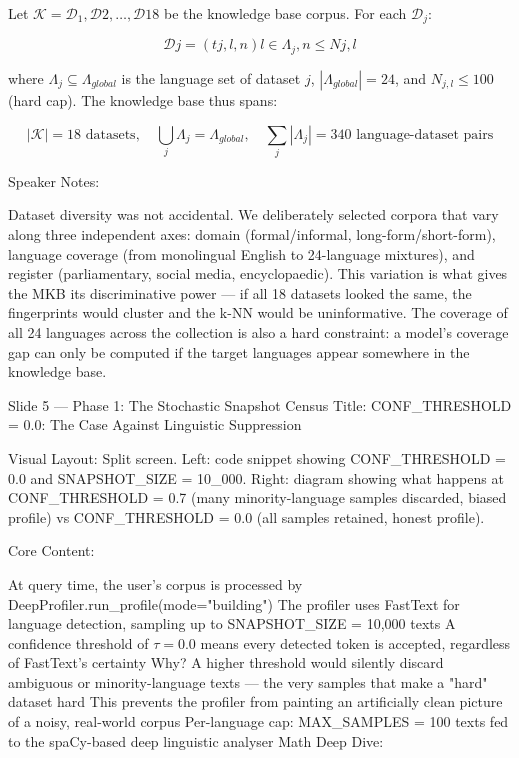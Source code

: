 Let $\mathcal{K} = {\mathcal{D}_1, \mathcal{D}2, \ldots, \mathcal{D}{18}}$ be the knowledge base corpus. For each $\mathcal{D}_j$:

$$\mathcal{D}j = {(t{j,l,n})}{l \in \Lambda_j, n \leq N{j,l}}$$

where $\Lambda_j \subseteq \Lambda_{global}$ is the language set of dataset $j$, $|\Lambda_{global}| = 24$, and $N_{j,l} \leq 100$ (hard cap). The knowledge base thus spans:

$$|\mathcal{K}| = 18 \text{ datasets}, \quad \bigcup_{j} \Lambda_j = \Lambda_{global}, \quad \sum_j |\Lambda_j| = 340 \text{ language-dataset pairs}$$

Speaker Notes:

Dataset diversity was not accidental. We deliberately selected corpora that vary along three independent axes: domain (formal/informal, long-form/short-form), language coverage (from monolingual English to 24-language mixtures), and register (parliamentary, social media, encyclopaedic). This variation is what gives the MKB its discriminative power — if all 18 datasets looked the same, the fingerprints would cluster and the k-NN would be uninformative. The coverage of all 24 languages across the collection is also a hard constraint: a model's coverage gap can only be computed if the target languages appear somewhere in the knowledge base.

Slide 5 — Phase 1: The Stochastic Snapshot Census
Title: CONF_THRESHOLD = 0.0: The Case Against Linguistic Suppression

Visual Layout: Split screen. Left: code snippet showing CONF_THRESHOLD = 0.0 and SNAPSHOT_SIZE = 10_000. Right: diagram showing what happens at CONF_THRESHOLD = 0.7 (many minority-language samples discarded, biased profile) vs CONF_THRESHOLD = 0.0 (all samples retained, honest profile).

Core Content:

At query time, the user's corpus is processed by DeepProfiler.run_profile(mode="building")
The profiler uses FastText for language detection, sampling up to SNAPSHOT_SIZE = 10,000 texts
A confidence threshold of $\tau = 0.0$ means every detected token is accepted, regardless of FastText's certainty
Why? A higher threshold would silently discard ambiguous or minority-language texts — the very samples that make a "hard" dataset hard
This prevents the profiler from painting an artificially clean picture of a noisy, real-world corpus
Per-language cap: MAX_SAMPLES = 100 texts fed to the spaCy-based deep linguistic analyser
Math Deep Dive:

